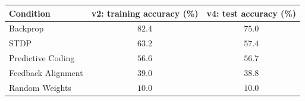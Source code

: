 \begin{tabular}{lcc}
\toprule
Condition & v2: training accuracy (\%) & v4: test accuracy (\%) \\
\midrule
Backprop & $82.4$ & $75.0$ \\
STDP & $63.2$ & $57.4$ \\
Predictive Coding & $56.6$ & $56.7$ \\
Feedback Alignment & $39.0$ & $38.8$ \\
Random Weights & $10.0$ & $10.0$ \\
\bottomrule
\end{tabular}
